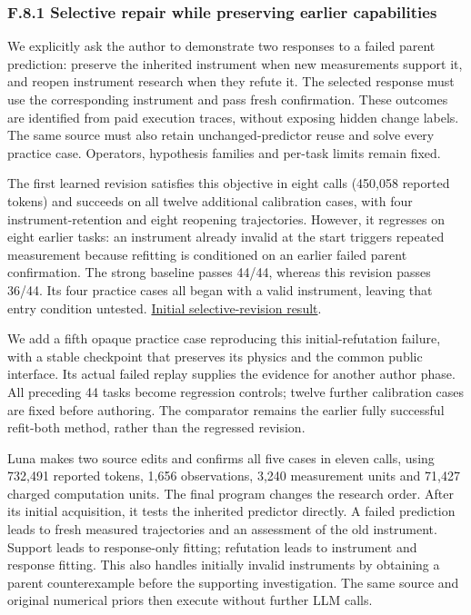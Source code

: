 \documentclass[11pt,a4paper]{article}
\begin{document}
\subsubsection*{F.8.1 Selective repair while preserving earlier capabilities}

We explicitly ask the author to demonstrate two responses to a failed parent
prediction: preserve the inherited instrument when new measurements support it,
and reopen instrument research when they refute it. The selected response must
use the corresponding instrument and pass fresh confirmation. These outcomes are
identified from paid execution traces, without exposing hidden change labels.
The same source must also retain unchanged-predictor reuse and solve every
practice case. Operators, hypothesis families and per-task limits remain fixed.


The first learned revision satisfies this objective in eight calls (450,058
reported tokens) and succeeds
on all twelve additional calibration cases, with four instrument-retention and
eight reopening trajectories. However, it regresses on eight earlier tasks:
an instrument already invalid at the start triggers repeated measurement because
refitting is conditioned on an earlier failed parent confirmation. The strong
baseline passes 44/44, whereas this revision passes 36/44. Its four practice cases
all began with a valid instrument, leaving that entry condition untested.
\hyperlink{artifact-73}{Initial selective-revision result}.


We add a fifth opaque practice case reproducing this initial-refutation failure,
with a stable checkpoint that preserves its physics and the common public
interface. Its actual failed replay supplies the evidence for another author
phase. All preceding 44 tasks become regression controls; twelve further
calibration cases are fixed before authoring. The comparator remains the earlier
fully successful refit-both method, rather than the regressed revision.


Luna makes two source edits and confirms all five cases in eleven calls, using
732,491 reported tokens, 1,656 observations, 3,240 measurement units and 71,427
charged computation units. The final program changes the research order. After
its initial acquisition, it tests the inherited predictor directly. A failed
prediction leads to fresh measured trajectories and an assessment of the old
instrument. Support leads to response-only fitting; refutation leads to instrument
and response fitting. This also handles initially invalid instruments by obtaining
a parent counterexample before the supporting investigation. The same source
and original numerical priors then execute without further LLM calls.
\end{document}
